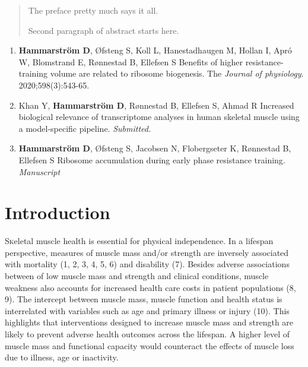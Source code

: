 \documentclass[twoside,10pt]{gihclass} %
\def\labelenumi{\Roman{enumi}.}
\begin{document}
  \begin{abstract}
    The preface pretty much says it all.

    \par

    Second paragraph of abstract starts here.
  \end{abstract}
  \begin{listofpapers}
    \begin{enumerate}
    \def\labelenumi{\Roman{enumi}.}
    \item
      \textbf{Hammarström D}, Øfsteng S, Koll L, Hanestadhaugen M, Hollan I, Apró W, Blomstrand E, Rønnestad B, Ellefsen S Benefits of higher resistance-training volume are related to ribosome biogenesis. The \emph{Journal of physiology}. 2020;598(3):543-65.
    \item
      Khan Y, \textbf{Hammarström D}, Rønnestad B, Ellefsen S, Ahmad R Increased biological relevance of transcriptome analyses in human skeletal muscle using a model-specific pipeline. \emph{Submitted.}
    \item
      \textbf{Hammarström D}, Øfsteng S, Jacobsen N, Flobergseter K, Rønnestad B, Ellefsen S Ribosome accumulation during early phase resistance training. \emph{Manuscript}
    \end{enumerate}
  \end{listofpapers}

  \hypersetup{linkcolor=black}
  \setcounter{tocdepth}{2}
  \tableofcontents

  \listoftables

  \listoffigures




\mainmatter %
\pagestyle{fancyplain} %

\setcounter{DefaultLines}{3}

\hypertarget{introduction}{%
\chapter{Introduction}\label{introduction}}

\lettrine{S}keletal muscle health is essential for physical independence. In a lifespan perspective, measures of muscle mass and/or strength are inversely associated with mortality
(1, 2, 3, 4, 5, 6)
and disability
(7).
Besides adverse associations between of low muscle mass and strength and clinical conditions, muscle weakness also accounts for increased health care costs in patient populations
(8, 9).
The intercept between muscle mass, muscle function and health status is interrelated with variables such as age and primary illness or injury
(10).
This highlights that interventions designed to increase muscle mass and strength are likely to prevent adverse health outcomes across the lifespan. A higher level of muscle mass and functional capacity would counteract the effects of muscle loss due to illness, age or inactivity.
\end{document}
